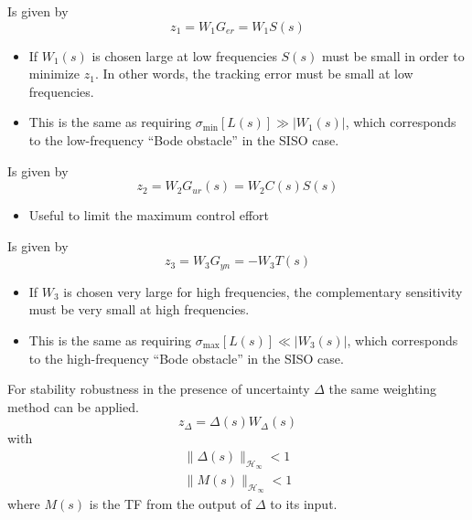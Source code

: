 \newpar{}

Is given by
\begin{equation*}
    z_1=W_1 G_{er} = W_1 S(s)
\end{equation*}
\begin{itemize}
    \item If $W_1(s)$ is chosen large at low frequencies $S(s)$ must be small in order to minimize $z_1$. In other words, the tracking error must be small at low frequencies.
    \item This is the same as requiring $\sigma_{\min}[L(s)] \gg |W_1(s)|$, which corresponds to the low-frequency ``Bode obstacle'' in the SISO case.
\end{itemize}

\newpar{}

Is given by
\begin{equation*}
    z_2=W_2 G_{ur}(s) = W_2 C(s) S(s)
\end{equation*}
\begin{itemize}
    \item Useful to limit the maximum control effort
\end{itemize}

\newpar{}

Is given by
\begin{equation*}
    z_3= W_3 G_{yn} =-W_3 T(s)
\end{equation*}
\begin{itemize}
    \item If $W_3$ is chosen very large for high frequencies, the complementary sensitivity must be very small at high frequencies.
    \item This is the same as requiring $\sigma_{\max}[L(s)] \ll |W_3(s)|$, which corresponds to the high-frequency ``Bode obstacle'' in the SISO case.
\end{itemize}

\newpar{}

For stability robustness in the presence of uncertainty $\Delta$ the same weighting method can be applied.
\begin{equation*}
    z_\Delta = \Delta(s)W_\Delta(s)
\end{equation*}
with
\begin{gather*}
    \|\Delta(s)\|_{\mathcal{H}_\infty} < 1 \\
    \|M(s)\|_{\mathcal{H}_\infty} < 1
\end{gather*}
where $M(s)$ is the TF from the output of $\Delta$ to its input.

